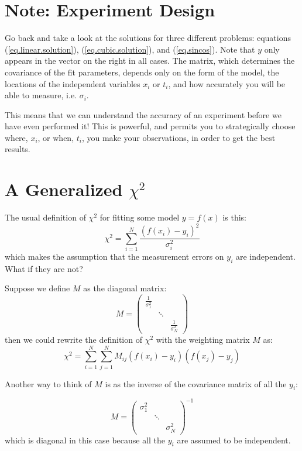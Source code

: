 \documentclass[letterpaper,12pt]{article}
\newcommand{\myMatrix}[1]{\bm{\mathit{#1}}}
\begin{document}
\section{Note: Experiment Design}

Go back and take a look at the solutions for three different problems: equations (\ref{eq.linear.solution}), (\ref{eq.cubic.solution}), and (\ref{eq.sincos}). Note that $y$ only appears in the vector on the right in all cases. The matrix, which determines the covariance of the fit parameters, depends only on the form of the model, the locations of the independent variables $x_i$ or $t_i$, and how accurately you will be able to measure, i.e. $\sigma_i$.

This means that we can understand the accuracy of an experiment before we have even performed it! This is powerful, and permits you to strategically choose where, $x_i$, or when, $t_i$, you make your observations, in order to get the best results.

\section{A Generalized $\chi^2$}
The usual definition of $\chi^2$ for fitting some model $y=f(x)$ is this:
\begin{equation}
\chi^2=\sum_{i=1}^N \frac{(f(x_i) - y_i)^2}{\sigma_i^2}
\end{equation}
which makes the assumption that the measurement errors on $y_i$ are independent. What if they are not?

Suppose we define $\myMatrix{M}$ as the diagonal matrix:
\begin{equation}
\myMatrix{M}=
\begin{pmatrix}
\frac{1}{\sigma_1^2} & & \\
& \ddots & \\
& & \frac{1}{\sigma_N^2}
\end{pmatrix}
\end{equation}
then we could rewrite the definition of $\chi^2$ with the weighting matrix $\myMatrix{M}$ as:
\begin{equation} \label{eq.general.chi.square}
\chi^2=\sum_{i=1}^N \sum_{j=1}^N \myMatrix{M}_{ij}(f(x_i) - y_i)(f(x_j) - y_j)
\end{equation}

Another way to think of $\myMatrix{M}$ is as the inverse of the covariance matrix of all the $y_i$:

\begin{equation}
\myMatrix{M}=
\begin{pmatrix}
\sigma_1^2 & & \\
& \ddots & \\
& & \sigma_N^2
\end{pmatrix}^{-1}
\end{equation}
which is diagonal in this case because all the $y_i$ are assumed to be independent.
\end{document}
